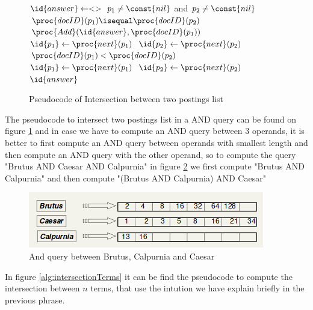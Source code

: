 \begin{figure}
    \caption{Pseudocode of Intersection between two postings list}
    \label{alg:intersection}
    \begin{codebox}
        \li $\id{answer} \gets <> $
        \li \While $p_1 \neq \const{nil}$ and $p_2 \neq \const{nil}$ 
            \Do
        \li     \If $\proc{docID}(p_1) \isequal \proc{docID}(p_2)$
        \li         \Then $\proc{Add}(\id{answer}, \proc{docID}(p_1))$
        \li               $\id{p_1} \gets \proc{next}(p_1)$
        \li               $\id{p_2} \gets \proc{next}(p_2)$
        \li     \ElseIf $\proc{docID}(p_1) < \proc{docID}(p_2)$
        \li         \Then $\id{p_1} \gets \proc{next}(p_1)$
        \li     \ElseNoIf $\id{p_2} \gets \proc{next}(p_2)$
                \End
            \End
        \li \Return $\id{answer}$
    \end{codebox}
\end{figure}

The pseudocode to intersect two postings list in a AND query can be found on figure \ref{alg:intersection} and
in case we have to compute an AND query between 3 operands, it is better to first compute an AND query between
operands with smallest length and then compute an AND query with the other operand, so to compute the 
query "Brutus AND Caesar AND Calpurnia" in figure \ref{img:andQuery} we first compute "Brutus AND Calpurnia" and
then compute "(Brutus AND Calpurnia) AND Caesar"

\begin{figure}
    \caption{And query between Brutus, Calpurnia and Caesar}
    \label{img:andQuery}
    \includegraphics[width=\textwidth]{Images/andQuery}
\end{figure}
In figure \ref{alg:intersectionTerms} it can be find the pseudocode to compute the intersection between 
$n$ terms, that use the intution we have explain briefly in the previous phrase.

